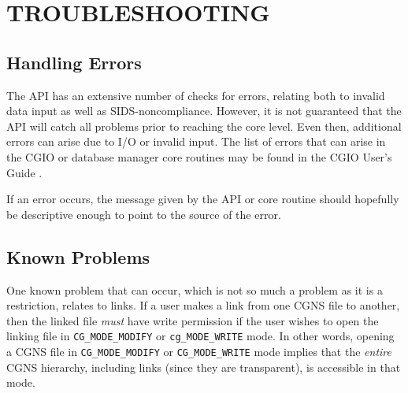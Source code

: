 \documentclass[12pt]{article}
\begin{document}
\newpage
\section{TROUBLESHOOTING} \label{sec:trouble}

\subsection{Handling Errors}

The API has an extensive number of checks for errors, relating both to
invalid data input as well as SIDS-noncompliance.
However, it is not guaranteed that the API will catch all problems prior
to reaching the core level. Even then, additional errors can arise due
to I/O or invalid input. The list of errors that can arise in the CGIO
or database manager core routines may be found in the
CGIO User's Guide \cite{CGNS1}.

If an error occurs, the message given by the API or core
routine should hopefully be descriptive enough to point to the source
of the error.

\subsection{Known Problems}

One known problem that can occur, which is not so much a
problem as it is a restriction, relates to links.  If a user makes
a link from one CGNS file to another, then the linked file
{\it must} have write permission if the user wishes
to open the linking file in {\tt CG\_MODE\_MODIFY} or {\tt cg\_MODE\_WRITE} mode.
In other words, opening a CGNS file in {\tt CG\_MODE\_MODIFY} or {\tt CG\_MODE\_WRITE} mode
implies that the {\it entire} CGNS hierarchy, including links (since they are
transparent), is accessible in that mode.  

\end{document}
